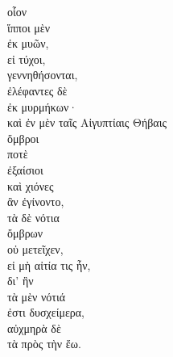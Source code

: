 {\large
\begin{greek}
\noindent  οἷον \\
ἵπποι μὲν \\
\tabto{2em} ἐκ μυῶν, \\
\tabto{4em} εἰ τύχοι, \\
\tabto{2em} γεννηθήσονται, \\
ἐλέφαντες δὲ \\
\tabto{2em} ἐκ μυρμήκων· \\
καὶ ἐν μὲν ταῖς Αἰγυπτίαις Θήβαις \\
\tabto{2em} ὄμβροι \\
\tabto{4em} ποτὲ \\
\tabto{2em} ἐξαίσιοι \\
\tabto{2em} καὶ χιόνες \\
\tabto{4em} ἂν ἐγίνοντο, \\
τὰ δὲ νότια \\
\tabto{2em} ὄμβρων \\
οὐ μετεῖχεν, \\
εἰ μὴ αἰτία τις ἦν, \\
\tabto{2em} δι’ ἣν \\
\tabto{2em} τὰ μὲν νότιά \\
\tabto{4em} ἐστι δυσχείμερα, \\
\tabto{2em} αὐχμηρὰ δὲ \\
\tabto{4em} τὰ πρὸς τὴν ἔω.\\

\end{greek}
}

